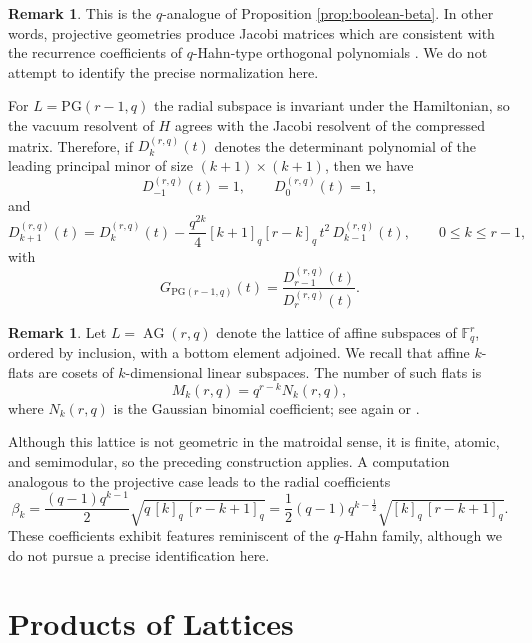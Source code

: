 \documentclass[11pt]{amsart}
\theoremstyle{definition}
\newtheorem{remark}[thm]{Remark}
\DeclareMathOperator{\AG}{AG}
\newcommand{\PG}{\mathrm{PG}}
\begin{document}
\begin{remark}
This is the $q$-analogue of Proposition \ref{prop:boolean-beta}.  In other words, projective geometries produce Jacobi matrices which are consistent with the recurrence coefficients of $q$-Hahn-type orthogonal polynomials \cite[Chapter 14]{Koekoek}. We do not attempt to identify the precise normalization here.
\end{remark}


For $L=\PG(r-1,q)$ the radial subspace is invariant under the Hamiltonian, so the vacuum resolvent of $H$ agrees with the Jacobi resolvent of the compressed matrix.
Therefore, if $D^{(r,q)}_k(t)$ denotes the determinant polynomial of the leading principal
minor of size $(k+1)\times (k+1)$, then we have
\[
D^{(r,q)}_{-1}(t)=1,\qquad D^{(r,q)}_0(t)=1,
\]
and
\[
D^{(r,q)}_{k+1}(t)
=
D^{(r,q)}_k(t)-\frac{q^{2k}}{4}[k+1]_q[r-k]_q\,t^2\,D^{(r,q)}_{k-1}(t),
\qquad 0\le k\le r-1,
\]
with
\[
G_{\PG(r-1,q)}(t)=\frac{D^{(r,q)}_{r-1}(t)}{D^{(r,q)}_{r}(t)}.
\]


\begin{remark}
    Let $L=\AG(r,q)$ denote the lattice of affine subspaces of $\mathbb{F}_q^r$, ordered by inclusion, with a bottom element adjoined. We recall that affine $k$-flats are cosets of $k$-dimensional linear subspaces. The number of such flats is
    \[
    M_k(r,q)=q^{r-k}N_k(r,q),
    \]
    where $N_k(r,q)$ is the Gaussian binomial coefficient; see again \cite[Section 1.4]{Dembowski} or \cite{Hirschfeld}.

    Although this lattice is not geometric in the matroidal sense, it is finite, atomic, and semimodular, so the preceding construction applies. A computation analogous to the projective case leads to the radial coefficients
    \[
    \beta_k
    =
    \frac{(q-1)q^{k-1}}{2}\sqrt{q\,[k]_q\,[r-k+1]_q}
    =
    \frac12(q-1)q^{k-\frac12}\sqrt{[k]_q\,[r-k+1]_q}.
    \]
    These coefficients exhibit features reminiscent of the $q$-Hahn family, although we do not pursue a precise identification here.
\end{remark}






\section{Products of Lattices}
\end{document}
